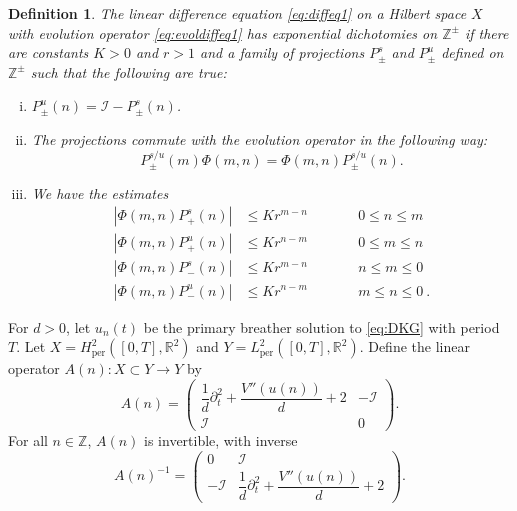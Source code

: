 \documentclass[12pt,reqno]{amsart}
\def\R{{\mathbb R}}
\def\Z{{\mathbb Z}}
\def\id{{\mathcal I}}
\def\per{\textrm{per}}
\newtheorem{definition}{Definition}
\begin{document}
\begin{definition}\label{def:ED}
The linear difference equation \cref{eq:diffeq1} on a Hilbert space $X$ with evolution operator \cref{eq:evoldiffeq1} has exponential dichotomies on $\Z^\pm$ if there are constants $K>0$ and $r>1$ and a family of projections $P_\pm^s$ and $P_\pm^u$ defined on $\Z^\pm$ such that the following are true:
\begin{enumerate}[(i)]
	\item $P_\pm^u(n) = \id - P_\pm^s(n)$.
	\item The projections commute with the evolution operator in the following way:
	\begin{equation}\label{projcommute}
	P_\pm^{s/u}(m) \Phi(m, n) =  \Phi(m, n) P_\pm^{s/u}(n).
	\end{equation}
	\item We have the estimates 
	\begin{equation}\label{eq:dichotomyest}
	\begin{aligned}
	|\Phi(m, n)P_+^s(n)| &\leq K r^{m - n} && \qquad 0 \leq n \leq m \\
	|\Phi(m, n)P_+^u(n)| &\leq K r^{n - m} && \qquad 0 \leq m \leq n \\
	|\Phi(m, n)P_-^s(n)| &\leq K r^{m - n} && \qquad n \leq m \leq 0 \\
	|\Phi(m, n)P_-^u(n)| &\leq K r^{n - m} && \qquad m \leq n \leq 0 \:.
	\end{aligned}
	\end{equation}
\end{enumerate}
\end{definition}

For $d>0$, let $u_n(t)$ be the primary breather solution to \cref{eq:DKG} with period $T$. Let $X = H^2_\per([0,T],\R^2)$ and $Y = L^2_\per([0,T],\R^2)$. Define the linear operator $A(n): X \subset Y \rightarrow Y$ by
\begin{equation}\label{eq:An}
A(n) = \begin{pmatrix}
\dfrac{1}{d}\partial_t^2 + \dfrac{V''(u(n))}{d} + 2 & -\id \\ \id & 0
\end{pmatrix}.
\end{equation}
For all $n \in \Z$, $A(n)$ is invertible, with inverse 
\begin{equation}\label{eq:Aninv}
A(n)^{-1} = \begin{pmatrix}
0 & \id \\ -\id & \dfrac{1}{d}\partial_t^2 + \dfrac{V''(u(n))}{d} + 2
\end{pmatrix}.
\end{equation}
\end{document}

